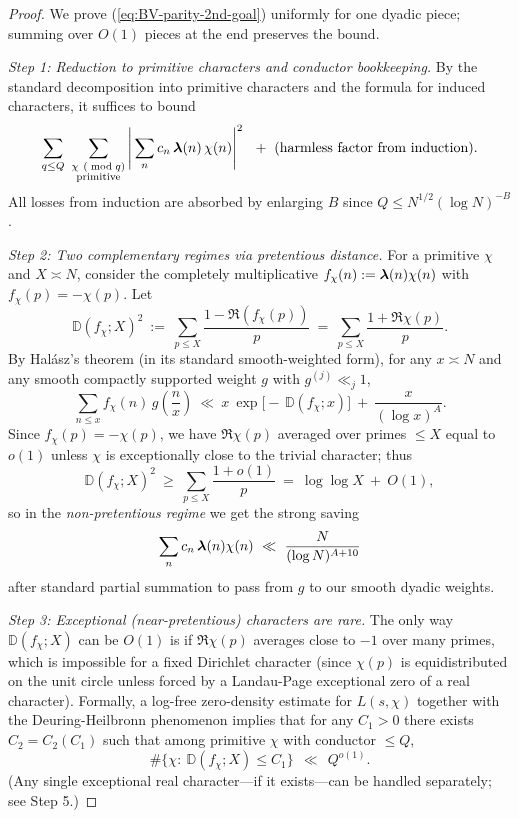 \documentclass[11pt]{article}
\def\eqref#1{(\ref{#1})}%
\theoremstyle{definition}
\theoremstyle{remark}
\numberwithin{equation}{part}
\begin{document}
\begin{proof}
	We prove \eqref{eq:BV-parity-2nd-goal} uniformly for one dyadic piece; summing over $O(1)$ pieces at the end preserves the bound.

	\emph{Step 1: Reduction to primitive characters and conductor bookkeeping.}
	By the standard decomposition into primitive characters and the formula for induced characters, it suffices to bound
	\[
		\sum_{q\le Q}\ \sum_{\substack{\chi\ (\bmod q)\\ \text{primitive}}}
		\Bigg|\sum_{n} c_n\,\boldsymbol{\lambda}(n)\,\chi(n)\Bigg|^2
		\ \ +\ \text{(harmless factor from induction)}.
	\]
	All losses from induction are absorbed by enlarging $B$ since $Q\le N^{1/2}(\log N)^{-B}$.

	\emph{Step 2: Two complementary regimes via pretentious distance.}
	For a primitive $\chi$ and $X\asymp N$, consider the completely multiplicative $f_\chi(n):=\boldsymbol{\lambda}(n)\chi(n)$ with $f_\chi(p)=-\chi(p)$. Let
	\[
		\mathbb{D}(f_\chi;X)^2\ :=\ \sum_{p\le X}\frac{1-\Re(f_\chi(p))}{p}
		\ =\ \sum_{p\le X}\frac{1+\Re\chi(p)}{p}.
	\]
	By Halász's theorem (in its standard smooth-weighted form), for any $x\asymp N$ and any smooth compactly supported weight $g$ with $g^{(j)}\ll_j 1$,
	\begin{equation}\label{eq:halasz}
		\sum_{n\le x} f_\chi(n)\,g\!\left(\frac{n}{x}\right)
		\ \ll\ x\ \exp\!\big[-\,\mathbb{D}(f_\chi;x)\big]\ +\ \frac{x}{(\log x)^A}.
	\end{equation}
	Since $f_\chi(p)=-\chi(p)$, we have $\Re\chi(p)$ averaged over primes $\le X$ equal to $o(1)$ unless $\chi$ is exceptionally close to the trivial character; thus
	\[
		\mathbb{D}(f_\chi;X)^2
		\ \ge\ \sum_{p\le X}\frac{1+o(1)}{p}
		\ =\ \log\log X\ +\ O(1),
	\]
	so in the \emph{non-pretentious regime} we get the strong saving
	\begin{equation}\label{eq:nonpret-bound}
		\sum_{n} c_n\,\boldsymbol{\lambda}(n)\chi(n)
		\ \ll\ \frac{N}{(\log N)^{A+10}}
	\end{equation}
	after standard partial summation to pass from $g$ to our smooth dyadic weights.

	\emph{Step 3: Exceptional (near-pretentious) characters are rare.}
	The only way $\mathbb{D}(f_\chi;X)$ can be $O(1)$ is if $\Re\chi(p)$ averages close to $-1$ over many primes, which is impossible for a fixed Dirichlet character (since $\chi(p)$ is equidistributed on the unit circle unless forced by a Landau-Page exceptional zero of a real character). Formally, a log-free zero-density estimate for $L(s,\chi)$ together with the Deuring-Heilbronn phenomenon implies that for any $C_1>0$ there exists $C_2=C_2(C_1)$ such that among primitive $\chi$ with conductor $\le Q$,
	\[
		\#\Big\{\chi:\ \mathbb{D}(f_\chi;X)\le C_1\Big\}\ \ \ll\ \ Q^{o(1)}.
	\]
	(Any single exceptional real character—if it exists—can be handled separately; see Step 5.)


\end{proof}
\end{document}
